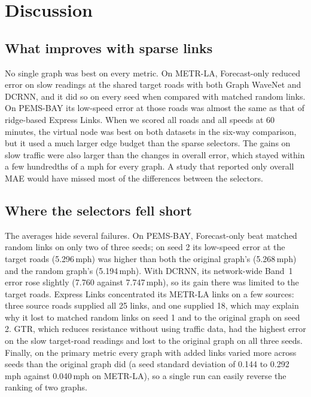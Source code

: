 \documentclass[journal]{IEEEtran}
\newcommand{\ms}{\,mph}
\begin{document}
\section{Discussion}\label{sec:discussion}

\subsection{What improves with sparse links}
No single graph was best on every metric. On METR-LA, Forecast-only reduced error on slow readings at the shared target roads with both Graph WaveNet and DCRNN, and it did so on every seed when compared with matched random links. On PEMS-BAY its low-speed error at those roads was almost the same as that of ridge-based Express Links. When we scored all roads and all speeds at 60 minutes, the virtual node was best on both datasets in the six-way comparison, but it used a much larger edge budget than the sparse selectors. The gains on slow traffic were also larger than the changes in overall error, which stayed within a few hundredths of a mph for every graph. A study that reported only overall MAE would have missed most of the differences between the selectors.

\subsection{Where the selectors fell short}
The averages hide several failures. On PEMS-BAY, Forecast-only beat matched random links on only two of three seeds; on seed 2 its low-speed error at the target roads (5.296\ms{}) was higher than both the original graph's (5.268\ms{}) and the random graph's (5.194\ms{}). With DCRNN, its network-wide Band~1 error rose slightly (7.760 against 7.747\ms{}), so its gain there was limited to the target roads. Express Links concentrated its METR-LA links on a few sources: three source roads supplied all 25 links, and one supplied 18, which may explain why it lost to matched random links on seed 1 and to the original graph on seed 2. GTR, which reduces resistance without using traffic data, had the highest error on the slow target-road readings and lost to the original graph on all three seeds. Finally, on the primary metric every graph with added links varied more across seeds than the original graph did (a seed standard deviation of 0.144 to 0.292\ms{} against 0.040\ms{} on METR-LA), so a single run can easily reverse the ranking of two graphs.
\end{document}
